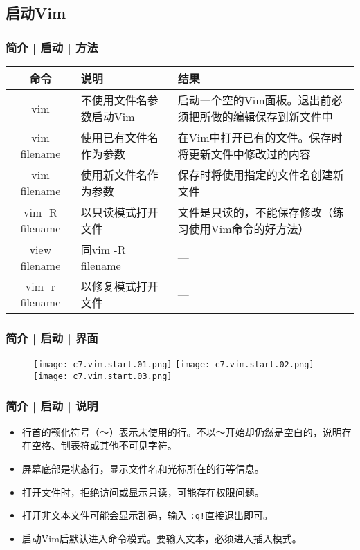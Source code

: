 \subsection{启动Vim}
\begin{frame}
  \frametitle{简介 | 启动 | \alert{方法}}
  \begin{table}
    \centering
    \begin{tabularx}{\textwidth}{cXX}
      \hline
      \rowcolor{blue!50}命令 & 说明 & 结果\\
      \hline
      vim & 不使用文件名参数启动Vim & 启动一个空的Vim面板。退出前必须把所做的编辑保存到新文件中\\
      vim filename & 使用已有文件名作为参数 & 在Vim中打开已有的文件。保存时将更新文件中修改过的内容\\
      vim filename & 使用新文件名作为参数 & 保存时将使用指定的文件名创建新文件\\
      vim -R filename & 以只读模式打开文件 & 文件是只读的，不能保存修改（练习使用Vim命令的好方法）\\
      view filename & 同vim -R filename & ---\\
      vim -r filename & 以修复模式打开文件 & ---\\
      \hline
    \end{tabularx}
  \end{table}
\end{frame}

\begin{frame}
  \frametitle{简介 | 启动 | 界面}
  \begin{figure}
    \centering
    \texttt{[image: c7.vim.start.01.png]}\quad
    \texttt{[image: c7.vim.start.02.png]}\\
    \texttt{[image: c7.vim.start.03.png]}
  \end{figure}
\end{frame}

\begin{frame}[fragile]
  \frametitle{简介 | 启动 | 说明}
  \begin{itemize}[<+->]
    \item 行首的颚化符号（～）表示未使用的行。不以～开始却仍然是空白的，说明存在空格、制表符或其他不可见字符。
    \item 屏幕底部是状态行，显示文件名和光标所在的行等信息。
    \item 打开文件时，拒绝访问或显示只读，可能存在权限问题。
    \item 打开非文本文件可能会显示乱码，输入 \verb|:q!|直接退出即可。
    \item 启动Vim后默认进入命令模式。要输入文本，必须进入插入模式。
  \end{itemize}
\end{frame}

